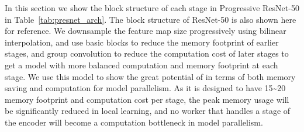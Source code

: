 In this section we show the block structure of each stage in Progressive ResNet-50 in
Table~\ref{tab:presnet_arch}. The block structure of ResNet-50 is also shown here for reference. We
downsample the feature map size progressively using bilinear interpolation, and  use basic blocks to
reduce the memory footprint of earlier stages, and group convolution to reduce the computation cost
of later stages to get a model with more balanced computation and memory footprint at each stage. We
use this model to show the great potential of \ours{} in terms of both memory saving and computation
for model parallelism. As it is designed to have 15\textasciitilde 20 memory footprint and
computation cost per stage, the peak memory usage will be significantly reduced in local learning,
and no worker that handles a stage of the encoder will become a computation bottleneck in model
parallelism.

